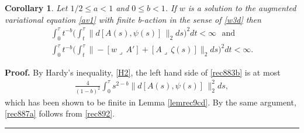 \documentclass[12pt]{article}
\newtheorem{corollary}[theorem]{Corollary}
\newenvironment{proof}[1][Proof]{\textbf{#1.} }{\ \rule{0.5em}{0.5em}}
\def \({\Big(}
\def \){\Big)}
\def \eref{\eqref}
\def \lrc{\lrcorner\,}
\numberwithin{equation}{section}
\begin{document}
\begin{corollary} \label{correc9} 
  Let $1/2 \le a < 1$ and $0 \le b <1$.
  If $w$ is a solution to the augmented variational equation \eref{av1} with finite b-action
  in the sense of \eref{w3d}  then 
\begin{align}
\int_0^\tau t^{-b}\Big(\int_t^\tau \|d [A(s),\psi(s)]\, \|_2 ds \Big)^2 dt < \infty  \ \ \ \text{and}    \label{rec883b} \\
\int_0^\tau t^{-b} \( \int_t^\tau  \|- [w\lrc A']  
                 +[ A\lrc  \zeta(s)] \|_2 ds\)^2 dt  <\infty.                                \label{rec887a}
\end{align}
\end{corollary}
\begin{proof}
By Hardy's inequality, \eref{H2}, the left hand side of \eref{rec883b} is at most 
 \begin{align}
 \frac{4}{(1-b)^2}\int_0^\tau s^{2-b}  \|d [A(s),\psi(s)]\, \|_2^2 ds,
 \end{align}
 which has been shown to be finite in Lemma \ref{lemrec9cd}.  By the same argument, \eref{rec887a}
 follows from \eref{rec892}.
\end{proof}
\end{document}
